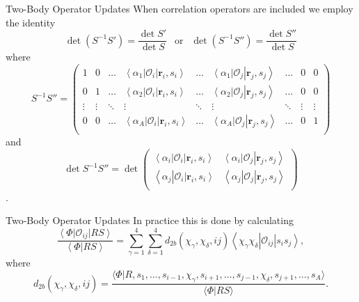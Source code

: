\documentclass{beamer}
\newcommand{\ket}[1]{\left| #1 \right>}
\newcommand{\bra}[1]{\left< #1 \right|}
\newcommand{\braket}[2]{\left< #1 | #2 \right>}
\renewcommand{\r}{\mathbf{r}}
\begin{document}
\begin{frame}{Two-Body Operator Updates}
When correlation operators are included we employ the identity
\begin{equation*}
      \det{\left(S^{-1}S'\right)} = \frac{\det{S'}}{\det S} ~~\text{ or }~~ \det{\left(S^{-1}S''\right)} = \frac{\det{S''}}{\det S}
\end{equation*}
where
\begin{equation*}
   S^{-1}S'' = 
   \begin{pmatrix}
      1 & 0 & \ldots & \bra{\alpha_1}\mathcal{O}_i\ket{\r_i,s_i} & \ldots & \bra{\alpha_1}\mathcal{O}_j\ket{\r_j,s_j} & \ldots & 0 & 0 \\
      0 & 1 & \ldots & \bra{\alpha_2}\mathcal{O}_i\ket{\r_i,s_i} & \ldots & \bra{\alpha_2}\mathcal{O}_j\ket{\r_j,s_j} & \ldots & 0 & 0 \\
      \vdots & \vdots & \ddots & \vdots & \ddots & \vdots & \ddots & \vdots & \vdots \\
      0 & 0 & \ldots & \bra{\alpha_A}\mathcal{O}_i\ket{\r_i,s_i} & \ldots & \bra{\alpha_A}\mathcal{O}_j\ket{\r_j,s_j} & \ldots & 0 & 1 \\
   \end{pmatrix}
\end{equation*}
and
\begin{equation*}
   \det{S^{-1}S''} =
   \det\begin{pmatrix}
      \bra{\alpha_i}\mathcal{O}_i\ket{\r_i,s_i} & \bra{\alpha_i}\mathcal{O}_j\ket{\r_j,s_j} \\
      \bra{\alpha_j}\mathcal{O}_i\ket{\r_i,s_i} & \bra{\alpha_j}\mathcal{O}_j\ket{\r_j,s_j} \\
   \end{pmatrix}
\end{equation*}.
\end{frame}

\begin{frame}{Two-Body Operator Updates}
In practice this is done by calculating
\begin{equation*}
   \frac{\bra{\Phi}\mathcal{O}_{ij}\ket{RS}}{\braket{\Phi}{RS}} = \sum\limits_{\gamma=1}^4\sum\limits_{\delta=1}^4 d_{2b}(\chi_\gamma,\chi_\delta,ij)\bra{\chi_\gamma\chi_\delta}\mathcal{O}_{ij}\ket{s_is_j},
\end{equation*}
where
\begin{equation*}
   d_{2b}(\chi_\gamma,\chi_\delta,ij)=\frac{\langle\Phi|R,s_1,\ldots,s_{i-1},\chi_\gamma,s_{i+1},\ldots,s_{j-1},\chi_\delta,s_{j+1},\ldots,s_A\rangle}{\langle \Phi|RS\rangle}.
\end{equation*}
\end{frame}
\end{document}
